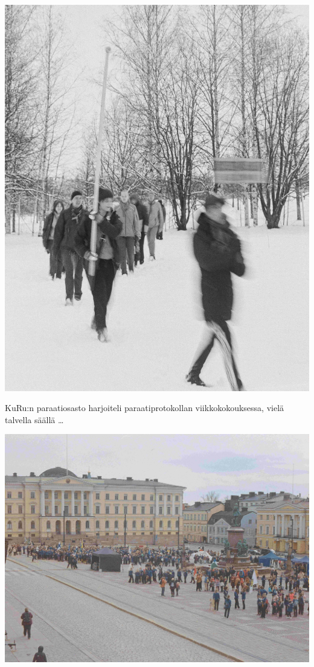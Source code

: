\documentclass[10pt,finnish,a5paper,twoside=semi]{scrartcl}
\begin{document}
\vspace*{-0.32cm}
\begin{multicols}{2}

	\begin{center}
		\noindent\includegraphics[width=0.9\linewidth]{assets/paraati1}
	\end{center}

	\vspace*{-0.32cm}
	\small KuRu:n paraatiosasto harjoiteli \mbox{paraati}protokollan
	viikkokokouksessa, vielä talvella säällä \ldots

	\begin{center}
		\noindent\includegraphics[width=0.9\linewidth]{assets/paraati4}
	\end{center}


\end{multicols}
\end{document}
